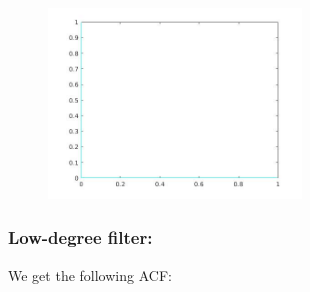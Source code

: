 \documentclass[a4paper,11pt]{article}
\begin{document}
\begin{figure}[!hp]
    \begin{center}
      \includegraphics[width=0.6\textwidth]{images/lab1_15.jpg}
    \end{center}
\end{figure}

\newpage

\subsubsection{Low-degree filter:}

We get the following ACF:
\end{document}
